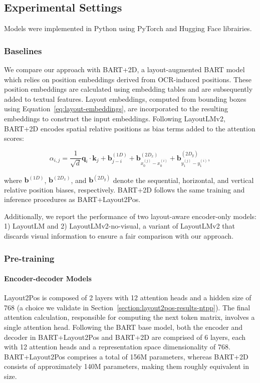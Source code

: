 \subsection{Experimental Settings}

Models were implemented in Python using PyTorch \citep{paszke2017automatic} and Hugging Face \citep{wolf2019huggingface} librairies. 

\subsubsection{Baselines}

We compare our approach with BART+2D, a layout-augmented \ac{BART} model which relies on position embeddings derived from \ac{OCR}-induced positions. These position embeddings are calculated using embedding tables \citep{devlin2018bert} and are subsequently added to textual features. Layout embeddings, computed from bounding boxes using Equation~\ref{eq:layout-embeddings}, are incorporated to the resulting embeddings to construct the input embeddings. Following LayoutLMv2, BART+2D encodes spatial relative positions as bias terms added to the attention scores:

\begin{equation}
  \alpha_{i,j} = \dfrac{1}{\sqrt{d}} \bm{q}_i \cdot \bm{k}_j + \bm{b}^{(1D)}_{j - i} + \bm{b}^{(2D_x)}_{x^{(j)}_{0} - x^{(i)}_{0}} + \bm{b}^{(2D_y)}_{y^{(j)}_{1} - y^{(i)}_{1}},
\end{equation}

\noindent where $\bm{b}^{(1D)}$, $\bm{b}^{(2D_x)}$, and $\bm{b}^{(2D_y)}$ denote the sequential, horizontal, and vertical relative position biases, respectively. BART+2D follows the same training and inference procedures as BART+Layout2Pos.

Additionally, we report the performance of two layout-aware encoder-only models: 1) LayoutLM and 2) LayoutLMv2-no-visual, a variant of LayoutLMv2 that discards visual information to ensure a fair comparison with our approach. 

\subsubsection{Pre-training}

\paragraph{Encoder-decoder Models} Layout2Pos is composed of 2 layers with 12 attention heads and a hidden size of 768 (a choice we validate in Section~\ref{section:layout2pos-results-ntpp}). The final attention calculation, responsible for computing the next token matrix, involves a single attention head. Following the \ac{BART} base model, both the encoder and decoder in BART+Layout2Pos and BART+2D are comprised of 6 layers, each with 12 attention heads and a representation space dimensionality of 768. BART+Layout2Pos comprises a total of 156M parameters, whereas BART+2D consists of approximately 140M parameters, making them roughly equivalent in size.

